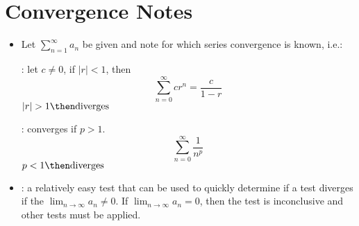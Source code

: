 
\section{Convergence Notes}
\begin{itemize}

  \item Let \(\displaystyle \sum_{n=1}^{\infty} a_n\) be given and note for
    which series convergence is known, i.e.:

    \vspace{10pt}

    \begin{multicols}{2}
      : let \(c \neq 0\), if \(|r| < 1\), then
      \[%
        \sum_{n=0}^{\infty} cr^n = \frac{c}{1-r}
      \]%
      \(|r| > 1 \then \text{diverges}\)

      : converges if \(p > 1\).
      \[%
        \sum_{n=0}^{\infty} \frac{1}{n^p}
      \]%
      \(p < 1 \then \text{diverges}\)
    \end{multicols}

  \item {}: a relatively easy
    test that can be used to quickly determine if a test diverges if the
    \(\lim_{n \to \infty} a_n \neq 0 \). If \(\lim_{n \to \infty} a_n = 0\),
    then the test is inconclusive and other tests must be applied.

\end{itemize}


